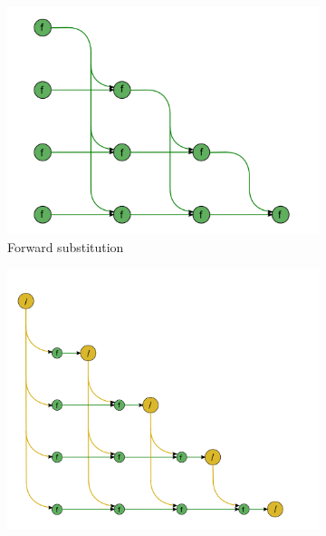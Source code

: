 \begin{figure}[ht!]
	\centering
	\begin{subfigure}[b]{0.48\textwidth}
		\centering
		\includegraphics[width=\textwidth]{images/ch03/procedures/forward-substitution.png}
		\caption{Forward substitution}
		\label{Figure:comparing-decomposers-and-solvers->decomposition-project-benchmarks->solvers-benchmark->comparison-of-execution-times-on-all-matrices->visualization-of-substitutions->forward}
	\end{subfigure}\hspace{0.03\textwidth}
	\begin{subfigure}[b]{0.48\textwidth}
		\centering
		\includegraphics[width=\textwidth]{images/ch03/procedures/backward-substitution.png}

\end{subfigure}
\end{figure}
